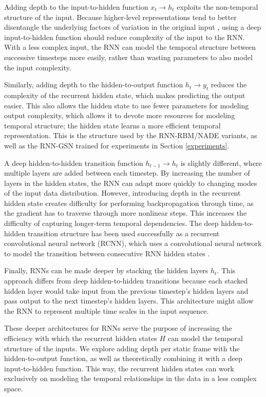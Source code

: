 Adding depth to the input-to-hidden function \(x_t \rightarrow h_t\) exploits the non-temporal structure of the input. Because higher-level representations tend to better disentangle the underlying factors of variation in the original input \cite{bengio13}, using a deep input-to-hidden function should reduce complexity of the input to the RNN. With a less complex input, the RNN can model the temporal structure between successive timesteps more easily, rather than wasting parameters to also model the input complexity.

Similarly, adding depth to the hidden-to-output function \(h_t \rightarrow y_t\) reduces the complexity of the recurrent hidden state, which makes predicting the output easier. This also allows the hidden state to use fewer parameters for modeling output complexity, which allows it to devote more resources for modeling temporal structure; the hidden state learns a more efficient temporal representation. This is the structure used by the RNN-RBM/NADE variants, as well as the RNN-GSN trained for experiments in Section \ref{experiments}.

A deep hidden-to-hidden transition function \(h_{t-1} \rightarrow h_t\) is slightly different, where multiple layers are added between each timestep. By increasing the number of layers in the hidden states, the RNN can adapt more quickly to changing modes of the input data distribution. However, introducing depth in the recurrent hidden state creates difficulty for performing backpropagation through time, as the gradient has to traverse through more nonlinear steps. This increases the difficulty of capturing longer-term temporal dependencies. The deep hidden-to-hidden transition structure has been used successfully as a recurrent convolutional neural network (RCNN), which uses a convolutional neural network to model the transition between consecutive RNN hidden states \cite{rcnn}.

Finally, RNNs can be made deeper by stacking the hidden layers \(h_t\). This approach differs from deep hidden-to-hidden transitions because each stacked hidden layer would take input from the previous timestep's hidden layers and pass output to the next timestep's hidden layers. This architecture might allow the RNN to represent multiple time scales in the input sequence.

These deeper architectures for RNNs serve the purpose of increasing the efficiency with which the recurrent hidden states $H$ can model the temporal structure of the inputs. We explore adding depth per static frame with the hidden-to-output function, as well as theoretically combining it with a deep input-to-hidden function. This way, the recurrent hidden states can work exclusively on modeling the temporal relationships in the data in a less complex space.
